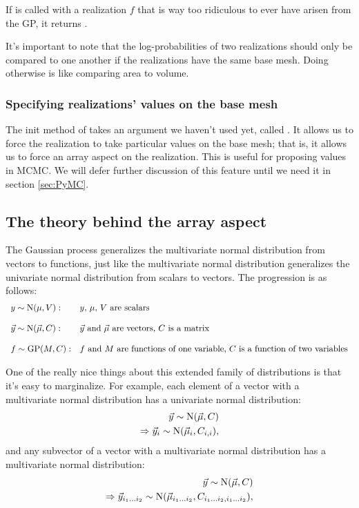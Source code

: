 \documentclass{manual}
\begin{document}
If  is called with a realization $f$ that is way too ridiculous to ever have arisen from the GP, it returns .

It's important to note that the log-probabilities of two realizations should only be compared to one another if the realizations have the same base mesh. Doing otherwise is like comparing area to volume.

\subsubsection{Specifying realizations' values on the base mesh}\label{subsub:force}

The init method of  takes an argument we haven't used yet, called . It allows us to force the realization to take particular values on the base mesh; that is, it allows us to force an array aspect on the realization. This is useful for proposing values in MCMC. We will defer further discussion of this feature until we need it in section \ref{sec:PyMC}. 

\subsection{The theory behind the array aspect} 
The Gaussian process generalizes the multivariate normal distribution from vectors to functions, just like the multivariate normal distribution generalizes the univariate normal distribution from scalars to vectors. The progression is as follows:
\begin{equation}
    \begin{array}{ll}
        y\sim\textup N(\mu,V): & \textup{$y$, $\mu$, $V$ are scalars}\\\\
        \vec y\sim\textup N(\vec \mu,C): & \textup{$\vec y$ and $\vec \mu$ are vectors, $C$ is a matrix}\\\\
        f\sim\textup{GP}(M, C): & \textup{$f$ and $M$ are functions of one variable, $C$ is a function of two variables}
    \end{array}
\end{equation}

One of the really nice things about this extended family of distributions is that it's easy to marginalize. For example, each element of a vector with a multivariate normal distribution has a univariate normal distribution:
\begin{eqnarray*}
    \vec y\sim\textup N(\vec \mu,C)\\
	\Rightarrow \vec y_i\sim\textup N(\vec \mu_i,C_{i,i}),
\end{eqnarray*}
and any subvector of a vector with a multivariate normal distribution has a multivariate normal distribution:
\begin{eqnarray*}
    \vec y\sim\textup N(\vec \mu,C)\\
	\Rightarrow \vec y_{i_1\ldots i_2}\sim\textup N(\vec \mu_{i_1\ldots i_2},C_{i_1\ldots i_2,i_1\ldots i_2}),
\end{eqnarray*}
\end{document}
